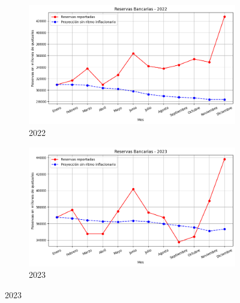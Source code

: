 \begin{figure}[H]
  \begin{subfigure}[b]{0.495\textwidth}
    \includegraphics[width=\linewidth]{imagenes/retro_2022.png}
    \caption{2022}
  \end{subfigure}
  \begin{subfigure}[b]{0.495\textwidth}
    \includegraphics[width=\linewidth]{imagenes/retro_2023.png}
    \caption{2023}
  \end{subfigure}
\end{figure}
